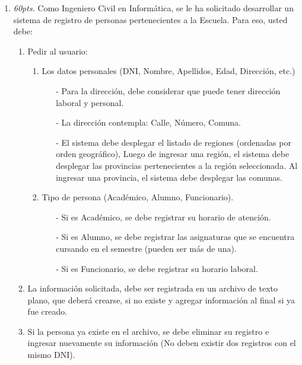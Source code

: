 \documentclass[10pt]{article}
\begin{document}
{\begin{enumerate}
        \item \emph{60pts.} Como Ingeniero Civil en Inform\'atica, se le ha solicitado desarrollar un sistema de registro de personas pertenecientes a la Escuela. Para eso, usted debe:
        \begin{enumerate}
            \item Pedir al usuario:
            \begin{enumerate}
                \item Los datos personales (DNI, Nombre, Apellidos, Edad, Direcci\'on, etc.)
                \begin{itemize}
                    \item[-] Para la direcci\'on, debe considerar que puede tener direcci\'on laboral y personal.
                    \item[-] La direcci\'on contempla: Calle, N\'umero, Comuna. 
                    \item[-] El sistema debe desplegar el listado de regiones (ordenadas por orden geogr\'afico), Luego de ingresar una regi\'on, el sistema debe desplegar las provincias pertenecientes a la regi\'on seleccionada. Al ingresar una provincia, el sistema debe desplegar las comunas.
                \end{itemize}
                \item Tipo de persona (Acad\'emico, Alumno, Funcionario).
                \begin{itemize}
                    \item[-] Si es Acad\'emico, se debe registrar su horario de atenci\'on.
                    \item[-] Si es Alumno, se debe registrar las asignaturas que se encuentra cursando en el semestre (pueden ser m\'as de una).
                    \item[-] Si es Funcionario, se debe registrar su horario laboral.
                \end{itemize}
            \end{enumerate}
            \item La informaci\'on solicitada, debe ser registrada en un archivo de texto plano, que deber\'a crearse, si no existe y agregar informaci\'on al final si ya fue creado.
            \item Si la persona ya existe en el archivo, se debe eliminar su registro e ingresar nuevamente su informaci\'on (No deben existir dos registros con el mismo DNI).
        \end{enumerate}
        \begin{itemize}

\end{itemize}
\end{enumerate}}
\end{document}

